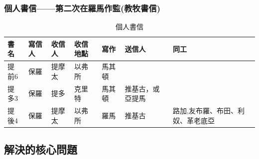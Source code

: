 \subsubsection{個人書信——第二次在羅馬作監(教牧書信)}
\begin{table}[H]
\begin{tabularx}{17cm}{lllllll}%
\hline
書名 & 寫信人 &收信人&收信地點&寫作&送信人&同工\\ \hline
提前6 & 保羅 & 提摩太 &以弗所&馬其頓&&\\%
提多3 & 保羅 &提多&克里特&馬其頓&推基古，或亞提馬& \\%
提後4 & 保羅 & 提摩太 &以弗所&羅馬& 推基古& 路加,友布羅、布田、利奴、革老底亞\\\hline
\end{tabularx}
\caption{個人書信}
\end{table}

\subsection{解決的核心問題}




